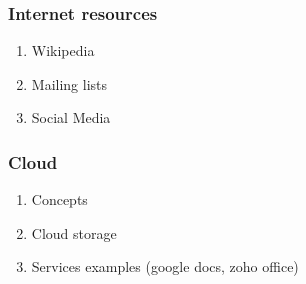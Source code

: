 \documentclass[11pt]{article}
\begin{document}
\subsubsection{Internet resources}
\label{sec:orgfaa0a40}
\begin{enumerate}
\item Wikipedia
\label{sec:org8ce0f16}
\item Mailing lists
\label{sec:orgb533c54}
\item Social Media
\label{sec:org2ab2396}
\end{enumerate}
\subsubsection{Cloud}
\label{sec:org3369f92}
\begin{enumerate}
\item Concepts
\label{sec:orgfa34127}
\item Cloud storage
\label{sec:org76fe1b8}
\item Services examples (google docs, zoho office)
\label{sec:org63a836f}
\end{enumerate}
\end{document}
